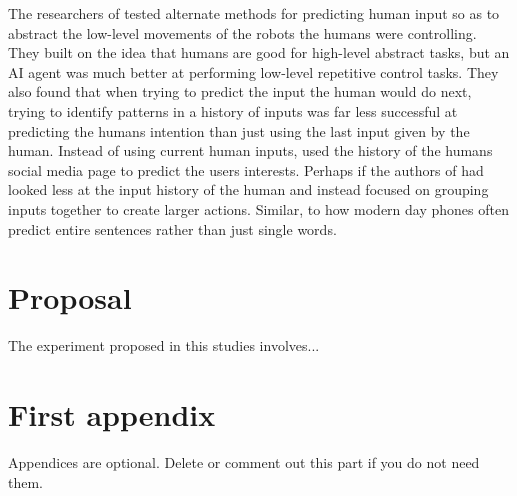 \documentclass[journal]{IEEEtran}
\begin{document}
The researchers of \cite{chipalkatty2013less} tested alternate methods for predicting human input so as to abstract the low-level movements of the robots the humans were controlling. They built on the idea that humans are good for high-level abstract tasks, but an AI agent was much better at performing low-level repetitive control tasks. They also found that when trying to predict the input the human would do next, trying to identify patterns in a history of inputs was far less successful at predicting the humans intention than just using the last input given by the human. Instead of using current human inputs, \cite{bhatia2016targeted} used the history of the humans social media page to predict the users interests. Perhaps if the authors of \cite{chipalkatty2013less} had looked less at the input history of the human and instead focused on grouping inputs together to create larger actions. Similar, to how modern day phones often predict entire sentences rather than just single words.



\section{Proposal}
The experiment proposed in this studies involves...





\appendices
\section{First appendix}
Appendices are optional. Delete or comment out this part if you do not need them.

\end{document}
